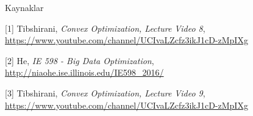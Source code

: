 \documentclass[12pt,fleqn]{article}\usepackage{../../common}
\begin{document}
Kaynaklar

[1] Tibshirani, {\em Convex Optimization, Lecture Video 8}, 
\url{https://www.youtube.com/channel/UCIvaLZcfz3ikJ1cD-zMpIXg}

[2] He, {\em IE 598 - Big Data Optimization},  
    \url{http://niaohe.ise.illinois.edu/IE598_2016/}

[3] Tibshirani, {\em Convex Optimization, Lecture Video 9}, 
\url{https://www.youtube.com/channel/UCIvaLZcfz3ikJ1cD-zMpIXg}
\end{document}
